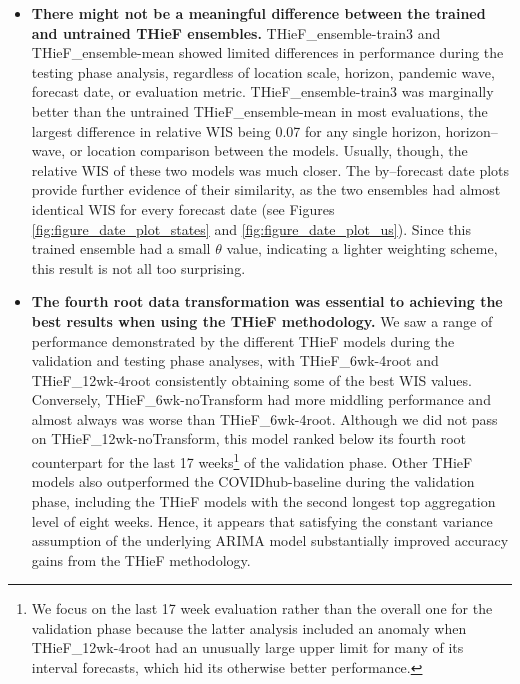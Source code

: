 \documentclass[thesis]{umassthesis}  %
\begin{document}
\begin{itemize}
\item \textbf{There might not be a meaningful difference between the trained and untrained THieF ensembles.} THieF\_ensemble-train3 and THieF\_ensemble-mean showed limited differences in performance during the testing phase analysis, regardless of location scale, horizon, pandemic wave, forecast date, or evaluation metric. THieF\_ensemble-train3 was marginally better than the untrained THieF\_ensemble-mean in most evaluations, the largest difference in relative WIS being 0.07 for any single horizon, horizon--wave, or location comparison between the models. Usually, though, the relative WIS of these two models was much closer. The by--forecast date plots provide further evidence of their similarity, as the two ensembles had almost identical WIS for every forecast date (see Figures \ref{fig:figure_date_plot_states} and \ref{fig:figure_date_plot_us}). Since this trained ensemble had a small $\theta$ value, indicating a lighter weighting scheme, this result is not all too surprising.

\item \textbf{The fourth root data transformation was essential to achieving the best results when using the THieF methodology.} We saw a range of performance demonstrated by the different THieF models during the validation and testing phase analyses, with THieF\_6wk-4root and THieF\_12wk-4root consistently obtaining some of the best WIS values. Conversely, THieF\_6wk-noTransform had more middling performance and almost always was worse than THieF\_6wk-4root. Although we did not pass on THieF\_12wk-noTransform, this model ranked below its fourth root counterpart for the last 17 weeks\footnote{We focus on the last 17 week evaluation rather than the overall one for the validation phase because the latter analysis included an anomaly when THieF\_12wk-4root had an unusually large upper limit for many of its interval forecasts, which hid its otherwise better performance.} of the validation phase. Other THieF models also outperformed the COVIDhub-baseline during the validation phase, including the THieF models with the second longest top aggregation level of eight weeks. Hence, it appears that satisfying the constant variance assumption of the underlying ARIMA model substantially improved accuracy gains from the THieF methodology.
\end{itemize}
\end{document}
